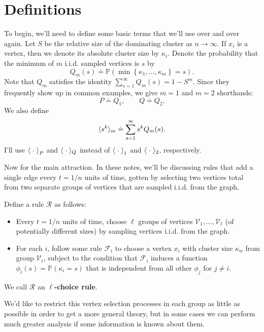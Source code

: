 \documentclass[twoside,10pt]{article}
\begin{document}
\tableofcontents

\section{Definitions}

To begin, we'll need to define some basic terms that we'll use over and over again. Let $S$ be the relative size of the dominating cluster as $n \to \infty$. If $x_i$ is a vertex, then we denote its absolute cluster size by $\kappa_i$. Denote the probability that the minimum of $m$ i.i.d. sampled vertices is $s$ by
\[
	Q_m(s) \doteq \mathbb{P}\left( \min\left\{ \kappa_1, \dots, \kappa_m \right\} = s \right) .
\] 
Note that $Q_m$ satisfies the identity $\sum_{s=1}^{\infty} Q_m(s) = 1-S^{m}$. Since they frequently show up in common examples, we give $m=1$ and $m=2$ shorthands:
\[
	P \doteq Q_1, \quad\quad Q \doteq Q_2.
\]
We also define
\[
	\langle s^{k} \rangle_{m} \doteq \sum_{s=1}^{\infty} s^{k} Q_m(s).
\] 
I'll use $\left\langle \;\cdot\; \right\rangle_{P}$ and $\langle \;\cdot\; \rangle_{Q}$ instead of $\left\langle \;\cdot\; \right\rangle_{1}$ and $\langle \;\cdot\; \rangle_{2}$, respectively.

Now for the main attraction. In these notes, we'll be discussing rules that add a single edge every $t=1/n$ units of time, gotten by selecting two vertices total from two separate groups of vertices that are sampled i.i.d. from the graph.

\begin{defn}[]
	Define a rule $\mathcal{R}$ as follows:
	\begin{itemize}
		\item Every $t=1/n$ units of time, choose $\ell$ groups of vertices $\mathcal{V}_1, \dots, \mathcal{V}_{\ell}$ (of potentially different sizes) by sampling vertices i.i.d. from the graph.
		\item For each $i$, follow some rule $\mathcal{F}_{i}$ to choose a vertex $x_i$ with cluster size $\kappa_w$ from group $\mathcal{V}_i$, subject to the condition that $\mathcal{F}_i$ induces a function $\phi_i(s) = \mathbb{P}\left( \kappa_i=s \right) $ that is independent from all other $\phi_j$ for $j \neq i$.
	\end{itemize}
We call $\mathcal{R}$ an \textbf{$\ell$-choice rule}.
\end{defn}

We'd like to restrict this vertex selection processes in each group as little as possible in order to get a more general theory, but in some cases we can perform much greater analysis if some information is known about them.
\end{document}
